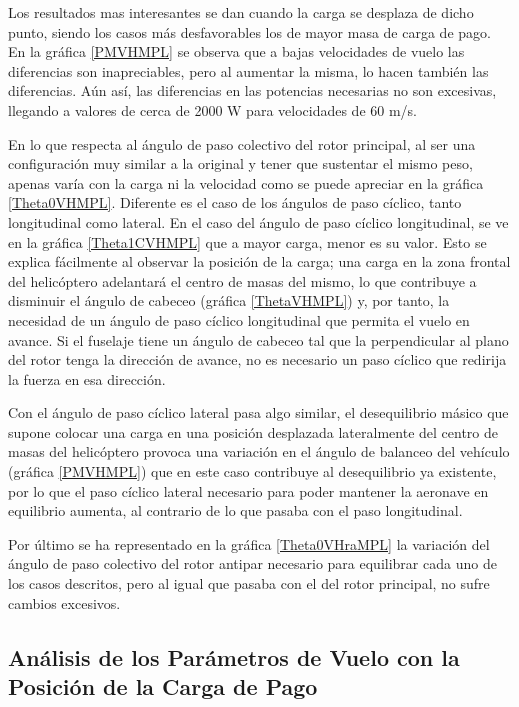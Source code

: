 Los resultados mas interesantes se dan cuando la carga se desplaza de dicho punto, siendo los casos más desfavorables los de mayor masa de carga de pago. En la gráfica \ref{PMVHMPL} se observa que a bajas velocidades de vuelo las diferencias son inapreciables, pero al aumentar la misma, lo hacen también las diferencias. Aún así, las diferencias en las potencias necesarias no son excesivas, llegando a valores de cerca de 2000 W para velocidades de 60 m/s.

En lo que respecta al ángulo de paso colectivo del rotor principal, al ser una configuración muy similar a la original y tener que sustentar el mismo peso, apenas varía con la carga ni la velocidad como se puede apreciar en la gráfica \ref{Theta0VHMPL}. Diferente es el caso de los ángulos de paso cíclico, tanto longitudinal como lateral. En el caso del ángulo de paso cíclico longitudinal, se ve en la gráfica \ref{Theta1CVHMPL} que a mayor carga, menor es su valor. Esto se explica fácilmente al observar la posición de la carga; una carga en la zona frontal del helicóptero adelantará el centro de masas del mismo, lo que contribuye a disminuir el ángulo de cabeceo (gráfica \ref{ThetaVHMPL}) y, por tanto, la necesidad de un ángulo de paso cíclico longitudinal que permita el vuelo en avance. Si el fuselaje tiene un ángulo de cabeceo tal que la perpendicular al plano del rotor tenga la dirección de avance, no es necesario un paso cíclico que redirija la fuerza en esa dirección.

Con el ángulo de paso cíclico lateral pasa algo similar, el desequilibrio másico que supone colocar una carga en una posición desplazada lateralmente del centro de masas del helicóptero provoca una variación en el ángulo de balanceo del vehículo (gráfica \ref{PMVHMPL}) que en este caso contribuye al desequilibrio ya existente, por lo que el paso cíclico lateral necesario para poder mantener la aeronave en equilibrio aumenta, al contrario de lo que pasaba con el paso longitudinal.

Por último se ha representado en la gráfica \ref{Theta0VHraMPL} la variación del ángulo de paso colectivo del rotor antipar necesario para equilibrar cada uno de los casos descritos, pero al igual que pasaba con el del rotor principal, no sufre cambios excesivos.

\subsection*{Análisis de los Parámetros de Vuelo con la Posición de la Carga de Pago}

